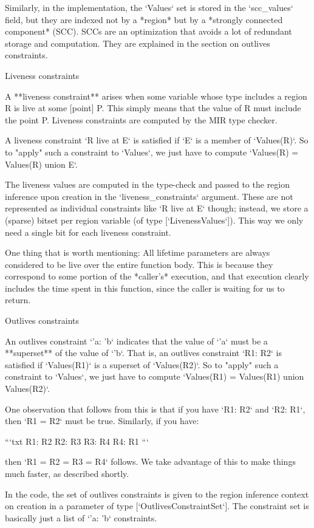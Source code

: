 \documentclass[11pt, a4paper]{article}
\begin{document}
Similarly, in the implementation, the `Values` set is stored in the
`scc\_values` field, but they are indexed not by a *region* but by a
*strongly connected component* (SCC). SCCs are an optimization that
avoids a lot of redundant storage and computation.  They are explained
in the section on outlives constraints.

Liveness constraints

A **liveness constraint** arises when some variable whose type
includes a region R is live at some [point] P. This simply means that
the value of R must include the point P. Liveness constraints are
computed by the MIR type checker.

A liveness constraint `R live at E` is satisfied if `E` is a member of
`Values(R)`. So to "apply" such a constraint to `Values`, we just have
to compute `Values(R) = Values(R) union {E}`.

The liveness values are computed in the type-check and passed to the
region inference upon creation in the `liveness\_constraints` argument.
These are not represented as individual constraints like `R live at E`
though; instead, we store a (sparse) bitset per region variable (of
type [`LivenessValues`]). This way we only need a single bit for each
liveness constraint.

One thing that is worth mentioning: All lifetime parameters are always
considered to be live over the entire function body. This is because
they correspond to some portion of the *caller's* execution, and that
execution clearly includes the time spent in this function, since the
caller is waiting for us to return.

Outlives constraints

An outlives constraint `'a: 'b` indicates that the value of `'a` must
be a **superset** of the value of `'b`. That is, an outlives
constraint `R1: R2` is satisfied if `Values(R1)` is a superset of
`Values(R2)`. So to "apply" such a constraint to `Values`, we just
have to compute `Values(R1) = Values(R1) union Values(R2)`.

One observation that follows from this is that if you have `R1: R2`
and `R2: R1`, then `R1 = R2` must be true. Similarly, if you have:

```txt
R1: R2
R2: R3
R3: R4
R4: R1
```

then `R1 = R2 = R3 = R4` follows. We take advantage of this to make things
much faster, as described shortly.

In the code, the set of outlives constraints is given to the region
inference context on creation in a parameter of type
[`OutlivesConstraintSet`]. The constraint set is basically just a list of `'a:
'b` constraints.
\end{document}
